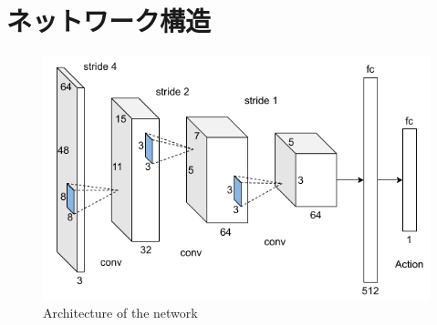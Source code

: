 
\section{ネットワーク構造}

\begin{figure}[h]
  \centering
  \includegraphics[keepaspectratio, scale=0.60] {images/RobotGuidance_network.png}
  \caption{Architecture of the network}
  \label{Fig:RobotGuidance_network}
\end{figure}

\newpage
